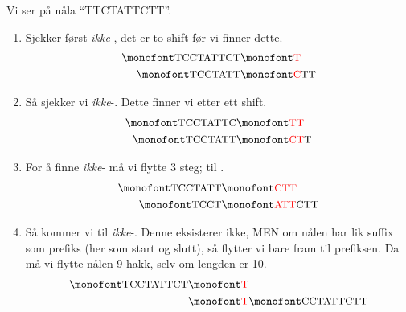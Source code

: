 \begin{example}
	Vi ser på nåla ``TTCTATTCTT''.
	\begin{enumerate}
		
		\item Sjekker først \textit{ikke}-, det er to shift før vi finner dette.
		\begin{align*}
			\text{\mono{TCCTATTCT}}&\text{\mono{{\textcolor{red}{T}}}}\\
			\text{\mono{TCCTATT}}&\text{\mono{\textcolor{red}{C}TT}}
		\end{align*}
		
		\item Så sjekker vi \textit{ikke}-. Dette finner vi etter ett shift.
		\begin{align*}
			\text{\mono{TCCTATTC}}&\text{\mono{\textcolor{red}{TT}}} \\
			\text{\mono{TCCTATT}}&\text{\mono{\textcolor{red}{CT}T}}
		\end{align*}
		
		\item For å finne \textit{ikke}- må vi flytte 3 steg; til .
		\begin{align*}
		\text{\mono{TCCTATT}}&\text{\mono{\textcolor{red}{CTT}}} \\
		\text{\mono{TCCT}}&\text{\mono{\textcolor{red}{ATT}CTT}}
		\end{align*}
		
		
		\item Så kommer vi til \textit{ikke}-. Denne eksisterer ikke, MEN om nålen har lik suffix som prefiks (her  som start og slutt), så flytter vi bare fram til prefiksen. Da må vi flytte nålen 9 hakk, selv om lengden er 10. 
		\begin{align*}
		\text{\mono{TCCTATTCT}}&\text{\mono{\textcolor{red}{T}}} \\
		&\text{\mono{\textcolor{red}{T}}}\text{\mono{CCTATTCTT}}
		\end{align*}
		
		
	\end{enumerate}
	

\end{example}
